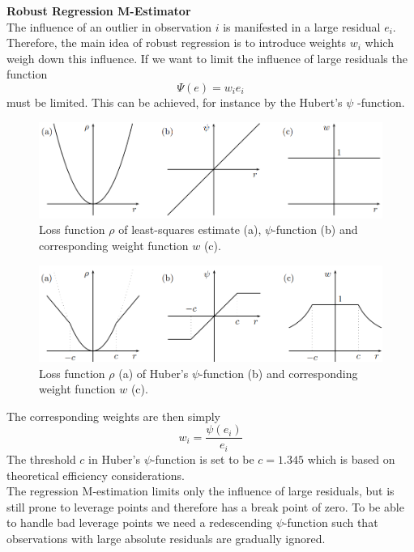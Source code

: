 \textbf{Robust Regression M-Estimator}\\
The influence of an outlier in observation $i$ is manifested in a large residual $e_i$. Therefore, the main idea of robust regression is to introduce weights $w_i$ which weigh down this influence. If we want to limit the influence of large residuals the function
\begin{equation}
  \Psi(e) = w_i e_i
\end{equation}
must be limited. This can be achieved, for instance by the Hubert's $\psi$ -function.
\begin{figure}[H]
  \centering
  \includegraphics[width=\linewidth]{Pics/10.4.1.png}
  \caption{Loss function $\rho$ of least-squares estimate (a), $\psi$-function (b) and corresponding weight function $w$ (c).}
\end{figure}
\begin{figure}[H]
  \centering
  \includegraphics[width=\linewidth]{Pics/10.4.2.png}
  \caption{Loss function $\rho$ (a) of Huber’s $\psi$-function (b) and corresponding weight function $w$ (c).}
\end{figure}
The corresponding weights are then simply
\begin{equation}
  w_i = \frac{\psi (e_i)}{e_i}
\end{equation}
The threshold $c$ in Huber’s $\psi$-function is set to be $c = 1.345$ which is based on theoretical efficiency considerations.\\
The regression M-estimation limits only the influence of large residuals, but is still prone to leverage points and therefore has a break point of zero. To be able to handle bad leverage points we need a redescending $\psi$-function such that observations with large absolute residuals are gradually ignored.\\

